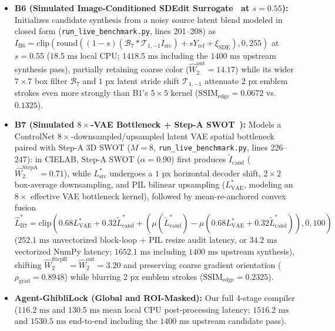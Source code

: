 \documentclass[conference,10pt]{IEEEtran}
\begin{document}
\begin{itemize}
    \item \textbf{B6 (Simulated Image-Conditioned SDEdit Surrogate~\cite{meng2022sdedit} at $s=0.55$):} Initializes candidate synthesis from a noisy source latent blend modeled in closed form (\texttt{run\_live\_benchmark.py}, lines 201--208) as $I_{\text{B6}} = \mathrm{clip}(\mathrm{round}((1-s)(\mathcal{B}_7 * \mathcal{T}_{1,-1} I_{\text{src}}) + s Y_{\text{ref}} + \xi_{\text{SDE}}), 0, 255)$ at $s=0.55$ ($18.5\text{ ms}$ local CPU; $1418.5\text{ ms}$ including the $1400\text{ ms}$ upstream synthesis pass), partially retaining coarse color ($\widehat{W}_2^{\text{out}} = 14.17$) while its wider $7\times 7$ box filter $\mathcal{B}_7$ and $1\text{ px}$ latent stride shift $\mathcal{T}_{1,-1}$ attenuate $2\text{ px}$ emblem strokes even more strongly than B1's $5\times 5$ kernel ($\mathrm{SSIM}_{\text{edge}} = 0.0672$ vs.\ $0.1325$).
    \item \textbf{B7 (Simulated $8\times$-VAE Bottleneck + Step-A SWOT~\cite{zhang2023}):} Models a ControlNet $8\times$-downsampled/upsampled latent VAE spatial bottleneck paired with Step-A 3D SWOT ($M=8$, \texttt{run\_live\_benchmark.py}, lines 226--247): in CIELAB, Step-A SWOT ($\alpha=0.90$) first produces $\widetilde{I}_{\text{cand}}$ ($\widehat{W}_2^{\text{StepA}} = 0.71$), while $L^*_{\text{src}}$ undergoes a $1\text{ px}$ horizontal decoder shift, $2\times 2$ box-average downsampling, and PIL bilinear upsampling ($L^*_{\text{VAE}}$, modeling an $8\times$ effective VAE bottleneck kernel), followed by mean-re-anchored convex fusion $\widehat{L}^*_{\text{B7}} = \mathrm{clip}(0.68 L^*_{\text{VAE}} + 0.32 \widetilde{L}^*_{\text{cand}} + (\mu(\widetilde{L}^*_{\text{cand}}) - \mu(0.68 L^*_{\text{VAE}} + 0.32 \widetilde{L}^*_{\text{cand}})), 0, 100)$ ($252.1\text{ ms}$ unvectorized block-loop + PIL resize audit latency, or $34.2\text{ ms}$ vectorized NumPy latency; $1652.1\text{ ms}$ including $1400\text{ ms}$ upstream synthesis), shifting $\widehat{W}_2^{\text{StepB}} = \widehat{W}_2^{\text{out}} = 3.20$ and preserving coarse gradient orientation ($\rho_{\text{grad}} = 0.8948$) while blurring $2\text{ px}$ emblem strokes ($\mathrm{SSIM}_{\text{edge}} = 0.2325$).
    \item \textbf{Agent-GhibliLock (Global and ROI-Masked):} Our full 4-stage compiler ($116.2\text{ ms}$ and $130.5\text{ ms}$ mean local CPU post-processing latency; $1516.2\text{ ms}$ and $1530.5\text{ ms}$ end-to-end including the $1400\text{ ms}$ upstream candidate pass).
\end{itemize}
\end{document}
